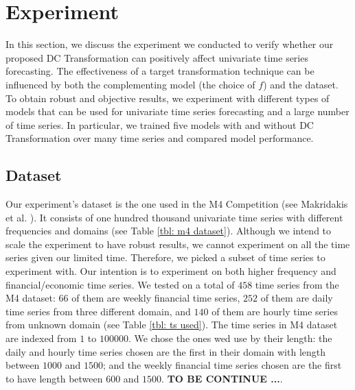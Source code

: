 \section{Experiment}\label{sec: experiment}
In this section, we discuss the experiment we conducted to verify whether our proposed DC Transformation can positively affect univariate time series forecasting. The effectiveness of a target transformation technique can be influenced by both the complementing model (the choice of $f$) and the dataset. To obtain robust and objective results, we experiment with different types of models that can be used for univariate time series forecasting and a large number of time series. In particular, we trained five models with and without DC Transformation over many time series and compared model performance.

\subsection{Dataset}
Our experiment's dataset is the one used in the M4 Competition (see Makridakis et al. \citeyear{MAKRIDAKIS202054}). It consists of one hundred thousand univariate time series with different frequencies and domains (see Table \ref{tbl: m4 dataset}). Although we intend to scale the experiment to have robust results, we cannot experiment on all the time series given our limited time. Therefore, we picked a subset of time series to experiment with. Our intention is to experiment on both higher frequency and financial/economic time series. We tested on a total of $458$ time series from the M4 dataset: $66$ of them are weekly financial time series, $252$ of them are daily time series from three different domain, and $140$ of them are hourly time series from unknown domain (see Table \ref{tbl: ts used}). The time series in M4 dataset are indexed from $1$ to $100000$. We chose the ones wed use by their length: the daily and hourly time series chosen are the first in their domain with length between $1000$ and $1500$; and the weekly financial time series chosen are the first to have length between $600$ and $1500$.  \textbf{TO BE CONTINUE ...}.

